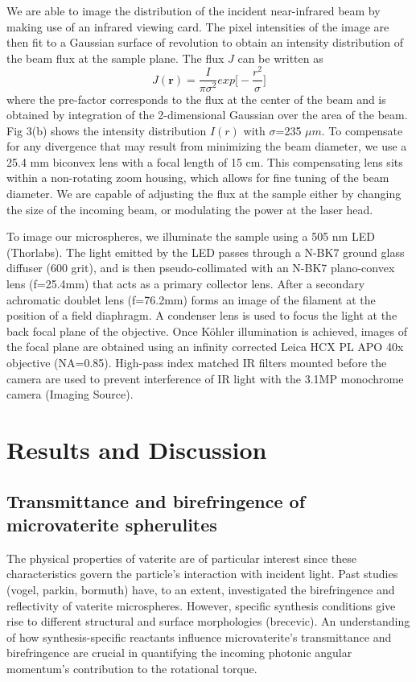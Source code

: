 \documentclass[12pt]{article}
\begin{document}
We are able to image the distribution of the incident near-infrared beam by making use of an infrared viewing card. The pixel intensities of the image are then fit to a Gaussian surface of revolution to obtain an intensity distribution of the beam flux at the sample plane. The flux $J$ can be written as 
\begin{equation}
J(\textbf{r})=\frac{I}{\pi\sigma^{2}}exp\bigg[-\frac{r^{2}}{\sigma}\bigg]\end{equation}
where the pre-factor corresponds to the flux at the center of the beam and is obtained by integration of the 2-dimensional Gaussian over the area of the beam.
Fig 3(b) shows the intensity distribution $I(r)$ with $\sigma$=235 $\mu m$. To compensate for any divergence that may result from minimizing the beam diameter, we use a 25.4 mm biconvex lens with a focal length of 15 cm. This compensating lens sits within a non-rotating zoom housing, which allows for fine tuning of the beam diameter. We are capable of adjusting the flux at the sample either by changing the size of the incoming beam, or modulating the power at the laser head. 

To image our microspheres, we illuminate the sample using a 505 nm LED (Thorlabs). The light emitted by the LED passes through a N-BK7 ground glass diffuser (600 grit), and is then pseudo-collimated with an N-BK7 plano-convex lens (f=25.4mm) that acts as a primary collector lens. After a secondary achromatic doublet lens (f=76.2mm) forms an image of the filament at the position of a field diaphragm. A condenser lens is used to focus the light at the back focal plane of the objective. Once Köhler illumination is achieved, images of the focal plane are obtained using an infinity corrected Leica HCX PL APO 40x objective (NA=0.85). High-pass index matched IR filters mounted before the camera are used to prevent interference of IR light with the 3.1MP monochrome camera (Imaging Source). 


\section*{Results and Discussion}

\subsection*{Transmittance and birefringence of microvaterite spherulites }
	The physical properties of vaterite are of particular interest since these characteristics govern the particle's interaction with incident light. Past studies (vogel, parkin, bormuth) have, to an extent, investigated the birefringence and reflectivity of vaterite microspheres. However,  specific synthesis conditions give rise to different structural and surface morphologies (brecevic). An understanding of how synthesis-specific  reactants influence microvaterite's transmittance and birefringence are crucial in quantifying the incoming photonic angular momentum's contribution to the rotational torque. 
\end{document}
